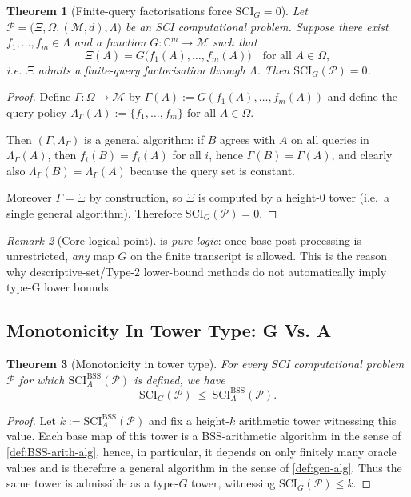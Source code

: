 \documentclass{lmcs} %
\theoremstyle{plain}
\theoremstyle{plain}
\newtheorem{theorem}{Theorem}[section]
\theoremstyle{definition}
\theoremstyle{remark}
\newtheorem{remark}[theorem]{Remark}
\theoremstyle{definition}
\theoremstyle{remark}
\numberwithin{equation}{section}
\newcommand{\SCIAbss}{\mathrm{SCI}^{\mathrm{BSS}}_A}
\begin{document}
\begin{theorem}[Finite-query factorisations force $\mathrm{SCI}_G=0$]\label{thm:finite-factor-scig0}
Let $\mathcal{P}=\bigl( \Xi,\Omega,(\mathcal{M},d),\Lambda \bigr)$ be an SCI computational problem. Suppose there exist
$f_1,\dots,f_m\in\Lambda$ and a function $G:\mathbb{C}^m\to \mathcal{M}$ such that
\[
\Xi(A)=G\bigl(f_1(A),\dots,f_m(A)\bigr)\quad\text{for all }A\in\Omega,
\]
i.e. $\Xi$ admits a finite-query factorisation through $\Lambda$.
Then $\mathrm{SCI}_G(\mathcal{P})=0$.
\end{theorem}
\begin{proof}
Define $\Gamma:\Omega\to \mathcal{M}$ by $\Gamma(A):=G(f_1(A),\dots,f_m(A))$ and define the query policy
$\Lambda_\Gamma(A):=\{f_1,\dots,f_m\}$ for all $A\in\Omega$.

Then $(\Gamma,\Lambda_\Gamma)$ is a general algorithm: if $B$ agrees with $A$ on all queries in
$\Lambda_\Gamma(A)$, then $f_i(B)=f_i(A)$ for all $i$, hence $\Gamma(B)=\Gamma(A)$, and clearly also
$\Lambda_\Gamma(B)=\Lambda_\Gamma(A)$ because the query set is constant.

Moreover $\Gamma=\Xi$ by construction, so $\Xi$ is computed by a height-$0$ tower (i.e.\ a single
general algorithm). Therefore $\mathrm{SCI}_G(\mathcal{P})=0$.
\end{proof}

\begin{remark}[Core logical point]\label{rem:core-logical}
 is \textit{pure logic}: once base post-processing is unrestricted,
\textit{any} map $G$ on the finite transcript is allowed.
This is the reason why descriptive-set/Type-2 lower-bound methods do not automatically imply type-G lower bounds.
\end{remark}

\subsection{Monotonicity In Tower Type: G Vs. A}

\begin{theorem}[Monotonicity in tower type]\label{thm:monotone-G-vs-BSS-A}
For every SCI computational problem $\mathcal P$ for which $\SCIAbss(\mathcal P)$
is defined, we have
\[
\mathrm{SCI}_{G}(\mathcal P)\ \le\ \SCIAbss(\mathcal P).
\]
\end{theorem}
\begin{proof}
Let $k:=\SCIAbss(\mathcal P)$ and fix a height-$k$ arithmetic tower
witnessing this value. Each base map of this tower is a BSS-arithmetic algorithm
in the sense of \cref{def:BSS-arith-alg}, hence, in particular, it depends on only finitely many oracle
values and is therefore a general algorithm in the sense of \cref{def:gen-alg}.
Thus the same tower is admissible as a type-$G$ tower, witnessing
$\mathrm{SCI}_{G}(\mathcal P)\le k$.
\end{proof}
\end{document}
